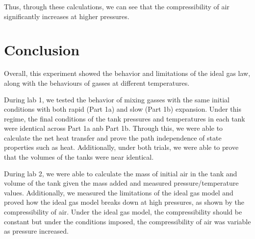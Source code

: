 \documentclass[12pt,letterpaper]{article}
\begin{document}
Thus, through these calculations, we can see that the compressibility of air significantly increases at higher pressures. \@







\section{Conclusion}

Overall, this experiment showed the behavior and limitations of the ideal gas law, along with the behaviours of gasses at different temperatures. \@

During lab 1, we tested the behavior of mixing gasses with the same initial conditions with both rapid (Part 1a) and slow (Part 1b) expansion. \@ Under this regime, the final conditions of the tank pressures and temperatures in each tank were identical across Part 1a anb Part 1b. \@  Through this, we were able to calculate the net heat transfer and prove the path independence of state properties such as heat. \@ Additionally, under both trials, we were able to prove that the volumes of the tanks were near identical. \@

During lab 2, we were able to calculate the mass of initial air in the tank and volume of the tank given the mass added and measured pressure/temperature values. \@ Additionally, we measured the limitations of the ideal gas model and proved how the ideal gas model breaks down at high pressures, as shown by the compressibility of air. \@ Under the ideal gas model, the compressibility should be constant but under the conditions imposed, the compressibility of air was variable as pressure increased. \@
\end{document}
